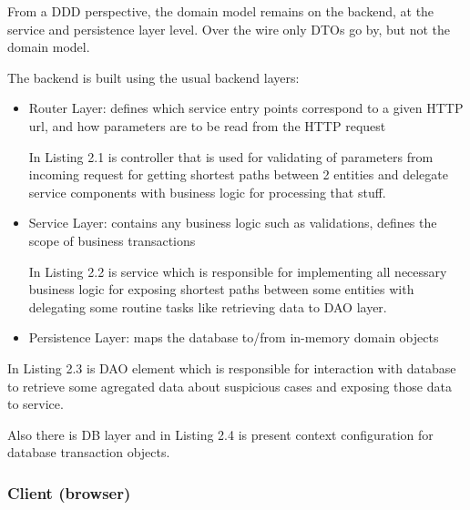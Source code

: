 \documentclass[12pt,a4paper,titlepage]{article}
\begin{document}
From a DDD perspective, the domain model remains on the backend, at the service and persistence layer level. Over the wire only DTOs go by, but not the domain model.

The backend is built using the usual backend layers:
\begin{itemize}
\item Router Layer: defines which service entry points correspond to a given HTTP url, and how parameters are to be read from the HTTP request

In Listing 2.1 is controller that is used for validating of parameters from incoming request for getting shortest paths between 2 entities and delegate service components with business logic for processing that stuff.




\item Service Layer: contains any business logic such as validations, defines the scope of business transactions

In Listing 2.2 is service which is responsible for implementing all necessary business logic for exposing shortest paths between some entities with delegating some routine tasks like retrieving data to DAO layer.



\item Persistence Layer: maps the database to/from in-memory domain objects
\end{itemize}

In Listing 2.3 is DAO element which is responsible for interaction with database to retrieve some agregated data about suspicious cases  and exposing those data to service.



Also there is DB layer and in Listing 2.4 is present context configuration for database transaction objects.



\subsubsection{Client (browser)}
\end{document}
